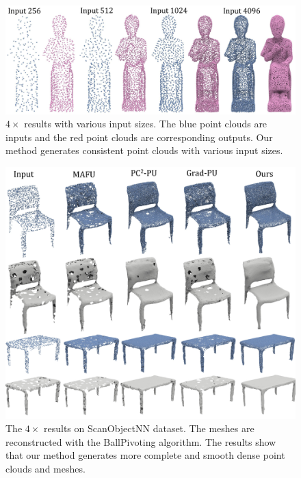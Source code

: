 \documentclass[letterpaper]{article} %
\begin{document}
\begin{figure}
\centering
\includegraphics[width=1.0\linewidth]{various_input_size.pdf}
\caption{$4\times$ results with various input sizes. The blue point clouds are inputs and the red point clouds are corresponding outputs. Our method generates consistent point clouds with various input sizes.}
\label{fig:robust_input_size}
\end{figure}


\begin{figure}
\centering
\includegraphics[width=1.0\linewidth]{scanobject.pdf}
\caption{The $4\times$ results on ScanObjectNN dataset. The meshes are reconstructed with the BallPivoting algorithm. The results show that our method generates more complete and smooth dense point clouds and meshes.}
\label{fig:scanobjectnn}

\end{figure}
\end{document}
